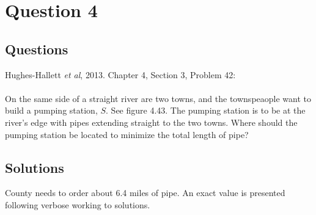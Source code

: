 \chapter{Question 4}
\section{Questions}
Hughes-Hallett \emph{et al}, 2013. Chapter 4, Section 3, Problem 42: \\
\\
\noindent On the same side of a straight river are two towns, and the
townspeaople want to build a pumping station, $S$. See figure 4.43. The pumping
station is to be at the river's edge with pipes extending straight to the two
towns. Where should the pumping station be located to minimize the total length
of pipe?

\section{Solutions}
County needs to order about 6.4 miles of pipe. An exact value is presented
following verbose working to solutions.

